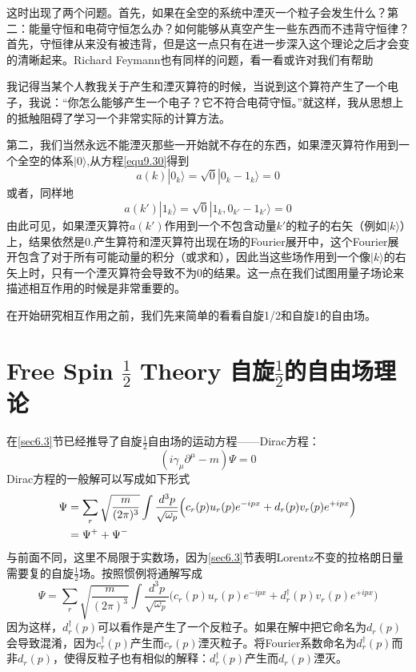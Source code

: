 这时出现了两个问题。首先，如果在全空的系统中湮灭一个粒子会发生什么？第二：能量守恒和电荷守恒怎么办？如何能够从真空产生一些东西而不违背守恒律？首先，守恒律从来没有被违背，但是这一点只有在进一步深入这个理论之后才会变的清晰起来。Richard Feymann也有同样的问题，看一看或许对我们有帮助\\
\begin{center}
\parbox{0.9\textwidth}{\small 我记得当某个人教我关于产生和湮灭算符的时候，当说到这个算符产生了一个电子，我说：“你怎么能够产生一个电子？它不符合电荷守恒。”就这样，我从思想上的抵触阻碍了学习一个非常实际的计算方法。}
\end{center}\vspace{4mm}
第二，我们当然永远不能湮灭那些一开始就不存在的东西，如果湮灭算符作用到一个全空的体系$|0\rangle$,从方程\eqref{equ9.30}得到
\begin{equation}
\label{equ9.31}
	a(k)|0_{k} \rangle=\sqrt{0}|0_{k}-1_{k} \rangle=0
\end{equation}
或者，同样地
\begin{equation}
\label{equ9.32}
	a(k')|1_{k} \rangle=\sqrt{0}|1_{k}, 0_{k'} - 1_{k'} \rangle=0
\end{equation}
由此可见，如果湮灭算符$a(k')$作用到一个不包含动量$k'$的粒子的右矢（例如$|k\rangle$）上，结果依然是$0$.产生算符和湮灭算符出现在场的Fourier展开中，这个Fourier展开包含了对于所有可能动量的积分（或求和），因此当这些场作用到一个像$|k\rangle$的右矢上时，只有一个湮灭算符会导致不为0的结果。这一点在我们试图用量子场论来描述相互作用的时候是非常重要的。

在开始研究相互作用之前，我们先来简单的看看自旋1/2和自旋1的自由场。

\section[自由的自旋$\frac{1}{2}$理论]{Free Spin $\frac{1}{2}$ Theory \quad 自旋$\frac{1}{2}$的自由场理论}
\label{sec9.3}
在\ref{sec6.3}节已经推导了自旋$\frac{1}{2}$自由场的运动方程——Dirac方程：
$$(i\gamma_{\mu}\partial^{\mu}-m)\Psi=0$$
Dirac方程的一般解可以写成如下形式
\begin{align}
	\Psi &= \sum_{r} \sqrt{ \frac{m}{(2\pi)^{3}} }\int \frac{d^{3}p}{\sqrt{\omega_{p}}} \Big( c_{r}(p)u_{r}(p)e^{-ipx}+d_{r}(p)v_{r}(p)e^{+ipx} \Big)  \label{equ9.33} \\
	& =\Psi^{+}+\Psi^{-} \notag
\end{align}
与前面不同，这里不局限于实数场，因为\ref{sec6.3}节表明Lorentz不变的拉格朗日量需要复的自旋$\frac{1}{2}$场。按照惯例将通解写成
\begin{equation}\label{equ9.34}
	\Psi = \sum_{r} \sqrt{\frac{m}{(2\pi)^{3}}}\int \frac{d^{3}p}{\sqrt{\omega_{p}}} \Big( c_{r}(p)u_{r}(p)e^{-ipx}+d^{\dagger}_{r}(p)v_{r}(p)e^{+ipx} \Big)
\end{equation}
因为这样，$d^{\dagger}_{r}(p)$可以看作是产生了一个反粒子。如果在解中把它命名为$d_{r}(p)$会导致混淆，因为$c^{\dagger}_{r}(p)$产生而$c_{r}(p)$湮灭粒子。将Fourier系数命名为$d_{r}^{\dagger}(p)$而非$d_{r}(p)$，使得反粒子也有相似的解释：$d^{\dagger}_{r}(p)$产生而$d_{r}(p)$湮灭。

